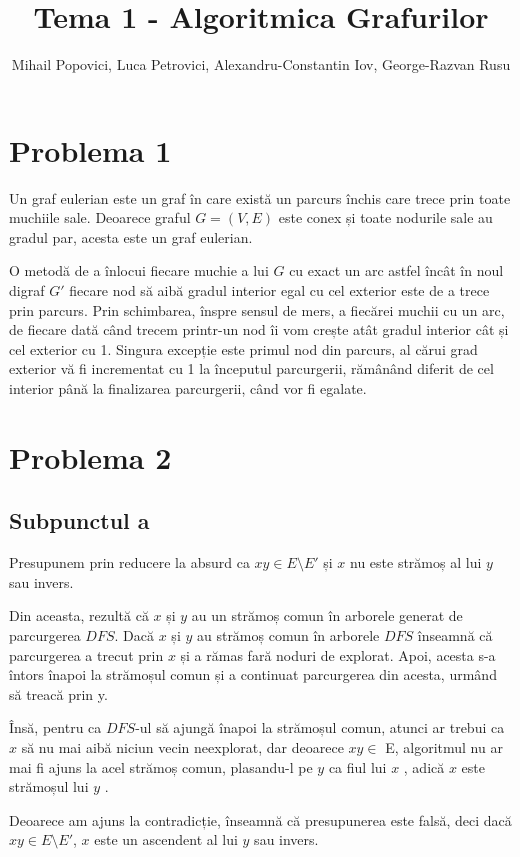 \documentclass{article}
\title{Tema 1 - Algoritmica Grafurilor}
\author{Mihail Popovici, Luca Petrovici, Alexandru-Constantin Iov, George-Razvan Rusu}
\begin{document}
\maketitle

\section*{\fontsize{20}{50}\selectfont Problema 1}
{\fontsize{14}{16}\selectfont  Un graf eulerian este un graf în care există un parcurs închis care trece prin toate muchiile sale. Deoarece graful $G = (V,E)$ este conex și toate nodurile sale au gradul par, acesta este un graf eulerian. 
\par O metodă de a înlocui fiecare muchie a lui $G$ cu exact un arc astfel încât în noul digraf $G'$ fiecare nod să aibă gradul interior egal cu cel exterior este de a trece prin parcurs. Prin schimbarea, înspre sensul de mers, a fiecărei muchii cu un arc, de fiecare dată când trecem printr-un nod îi vom crește atât gradul interior cât și cel exterior cu 1. Singura excepție este primul nod din parcurs, al cărui grad exterior vă fi incrementat cu 1 la începutul parcurgerii, rămânând diferit de cel interior până la finalizarea parcurgerii, când vor fi egalate.
}

\section*{\fontsize{20}{50}\selectfont Problema 2}
\subsection*{\fontsize{16}{30}\selectfont Subpunctul a}
{\fontsize{14}{16}\selectfont  Presupunem prin reducere la absurd ca $xy \in E \setminus  E'$ și $x$ nu este strămoș al lui $y$ sau invers.
\par Din aceasta, rezultă că $x$ și $y$ au un strămoș comun în arborele generat de parcurgerea $DFS$. Dacă $x$ și $y$ au strămoș comun în arborele $DFS$ înseamnă că parcurgerea a trecut prin $x$ și a rămas fară noduri de explorat. Apoi, acesta s-a întors înapoi la strămoșul comun și a continuat parcurgerea din acesta, urmând să treacă prin y. 
\par Însă, pentru ca $DFS$-ul să ajungă înapoi la strămoșul comun, atunci ar trebui ca $x$ să nu mai aibă niciun vecin neexplorat, dar deoarece $xy \in$ E, algoritmul nu ar mai fi ajuns la acel strămoș comun, plasandu-l pe $y$ ca fiul lui $x$ , adică $x$ este strămoșul lui $y$ .
\par Deoarece am ajuns la contradicție, înseamnă că presupunerea este falsă, deci dacă $xy \in E \setminus E'$, $x$ este un ascendent al lui $y$ sau invers.
}
\end{document}
